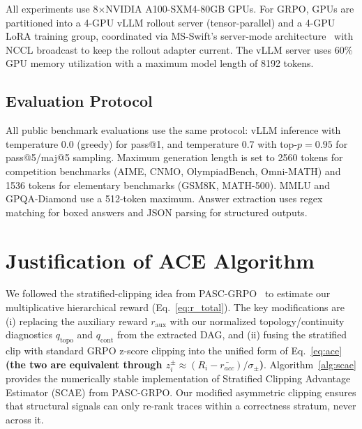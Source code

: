 All experiments use 8$\times$NVIDIA A100-SXM4-80GB GPUs.
For GRPO, GPUs are partitioned into a 4-GPU vLLM rollout server (tensor-parallel) and a 4-GPU LoRA training group, coordinated via MS-Swift's server-mode architecture~\citep{msswift} with NCCL broadcast to keep the rollout adapter current.
The vLLM server uses 60\% GPU memory utilization with a maximum model length of 8192 tokens.

\subsection{Evaluation Protocol}

All public benchmark evaluations use the same protocol: vLLM inference with temperature 0.0 (greedy) for pass@1, and temperature 0.7 with top-$p{=}0.95$ for pass@5/maj@5 sampling.
Maximum generation length is set to 2560 tokens for competition benchmarks (AIME, CNMO, OlympiadBench, Omni-MATH) and 1536 tokens for elementary benchmarks (GSM8K, MATH-500).
MMLU and GPQA-Diamond use a 512-token maximum.
Answer extraction uses regex matching for boxed answers and JSON parsing for structured outputs.

\section{Justification of ACE Algorithm}
\label{app:ace}
We followed the stratified-clipping idea from PASC-GRPO~\citep{liu2026graph} to estimate our multiplicative hierarchical reward (Eq.~\ref{eq:r_total}).
The key modifications are (i) replacing the auxiliary reward $r_{\mathrm{aux}}$ with our normalized topology/continuity diagnostics $q_{\mathrm{topo}}$ and $q_{\mathrm{cont}}$ from the extracted DAG, and (ii) fusing the stratified clip with standard GRPO z-score clipping into the unified form of Eq.~\eqref{eq:ace} \textbf{(the two are equivalent through $z_i^{\pm}\approx(R_i-\bar{r_{acc}})/\sigma_{\pm}$)}. Algorithm~\ref{alg:scae} provides the numerically stable implementation of Stratified Clipping Advantage Estimator (SCAE) from PASC-GRPO. Our modified asymmetric clipping ensures that structural signals can only re-rank traces within a correctness stratum, never across it.


